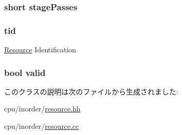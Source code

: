 \label{classResourceRequest_a9da7aa2f94c428eaed5adad96a6ab151}
\hypertarget{classResourceRequest_a48e838358cea6d9b841754a78c089269}{
\subsubsection[{stagePasses}]{\setlength{\rightskip}{0pt plus 5cm}short {\bf stagePasses}}}
\label{classResourceRequest_a48e838358cea6d9b841754a78c089269}
\hypertarget{classResourceRequest_aa508770268ee4ceaf16054b9e0be0e17}{
\subsubsection[{tid}]{ {\bf tid}}}
\label{classResourceRequest_aa508770268ee4ceaf16054b9e0be0e17}
\hyperlink{classResource}{Resource} Identification \hypertarget{classResourceRequest_a28e3c179a86f337095088b3ca02a2b2a}{
\subsubsection[{valid}]{\setlength{\rightskip}{0pt plus 5cm}bool {\bf valid}}}
\label{classResourceRequest_a28e3c179a86f337095088b3ca02a2b2a}


このクラスの説明は次のファイルから生成されました:\begin{DoxyCompactItemize}
\item 
cpu/inorder/\hyperlink{resource_8hh}{resource.hh}\item 
cpu/inorder/\hyperlink{resource_8cc}{resource.cc}\end{DoxyCompactItemize}

